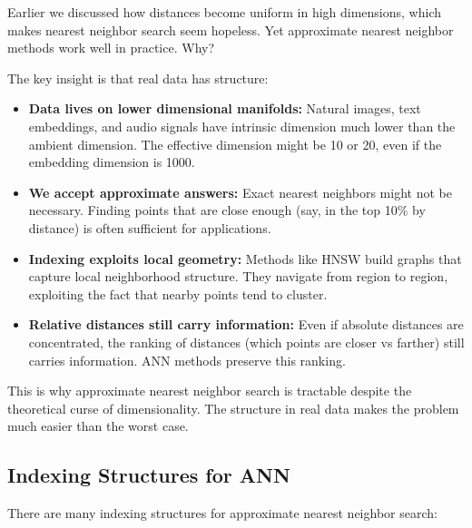 Earlier we discussed how distances become uniform in high dimensions, which makes nearest neighbor search seem hopeless. Yet approximate nearest neighbor methods work well in practice. Why?

The key insight is that real data has structure:

\begin{itemize}
\item \textbf{Data lives on lower dimensional manifolds:} Natural images, text embeddings, and audio signals have intrinsic dimension much lower than the ambient dimension. The effective dimension might be 10 or 20, even if the embedding dimension is 1000.

\item \textbf{We accept approximate answers:} Exact nearest neighbors might not be necessary. Finding points that are close enough (say, in the top 10\% by distance) is often sufficient for applications.

\item \textbf{Indexing exploits local geometry:} Methods like HNSW build graphs that capture local neighborhood structure. They navigate from region to region, exploiting the fact that nearby points tend to cluster.

\item \textbf{Relative distances still carry information:} Even if absolute distances are concentrated, the ranking of distances (which points are closer vs farther) still carries information. ANN methods preserve this ranking.
\end{itemize}

\vspace{1em}

This is why approximate nearest neighbor search is tractable despite the theoretical curse of dimensionality. The structure in real data makes the problem much easier than the worst case.

\vspace{1.5em}

\subsection{Indexing Structures for ANN}

There are many indexing structures for approximate nearest neighbor search:

